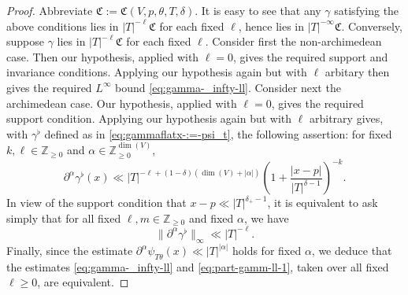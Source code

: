 \documentclass[reqno]{amsart}
\theoremstyle{plain} \newtheorem{theorem} {Theorem}
\theoremstyle{definition} \newtheorem{definition} [theorem] {Definition}
\theoremstyle{itplain} %
\numberwithin{equation}{section}
\numberwithin{theorem}{section}
\renewcommand{\geq}{\geqslant}
\begin{document}
\begin{proof}
  Abbreviate $\mathfrak{C} := \mathfrak{C}(V,p,\theta,T,\delta)$.  It is easy to see that any $\gamma$ satisfying the above conditions lies in $|T|^{-\ell} \mathfrak{C} $ for each fixed $\ell$, hence lies in $|T|^{-\infty} \mathfrak{C}$.  Conversely, suppose $\gamma$ lies in $|T|^{-\ell} \mathfrak{C}$ for each fixed $\ell$.  Consider first the non-archimedean case.  Then our hypothesis, applied with $\ell = 0$, gives the required support and invariance conditions.  Applying our hypothesis again but with $\ell$ arbitary then gives the required $L^\infty$ bound \eqref{eq:gamma-_infty-ll}.  Consider next the archimedean case.  Our hypothesis, applied with $\ell = 0$, gives the required support condition.  Applying our hypothesis again but with $\ell$ arbitrary gives, with $\gamma^{\flat}$ defined as in \eqref{eq:gammaflatx-:=-psi_t}, the following assertion: for fixed $k,\ell \in \mathbb{Z}_{\geq 0}$ and $\alpha \in \mathbb{Z}_{\geq 0}^{\dim(V)}$,
  \begin{equation*}
    \partial^\alpha \gamma^{\flat}(x) \ll
    |T|^{-\ell + (1 - \delta)(\dim(V) + |\alpha|)} \left( 1 + \frac{|x - p|}{|T|^{\delta - 1}} \right)^{-k}.
  \end{equation*}
  In view of the support condition that $x - p \ll |T|^{\delta_+ - 1}$, it is equivalent to ask simply that for all fixed $\ell, m \in \mathbb{Z}_{\geq 0}$ and fixed $\alpha$, we have
  \begin{equation}\label{eq:part-gamm-ll-1}
    \|\partial^\alpha \gamma^{\flat}\|_{\infty} \ll |T|^{-\ell}.
  \end{equation}
  Finally, since the estimate $\partial^\alpha \psi_{T \theta}(x) \ll |T|^{|\alpha|}$ holds for fixed $\alpha$, we deduce that the estimates \eqref{eq:gamma-_infty-ll} and \eqref{eq:part-gamm-ll-1}, taken over all fixed $\ell \geq 0$, are equivalent.
\end{proof}
\end{document}
